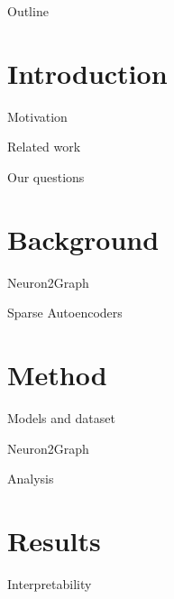 \documentclass[aspectratio=169,hyperref={pdfpagelabels=false}]{beamer}
\subtitle{\thesissubtitle}
\title{\thesistitle}
\begin{document}
\inserttitlepage


\begin{frame}{Outline} %
	\tableofcontents

\end{frame}

\section{Introduction} %
\begin{frame}{Motivation} %

\end{frame}

\begin{frame}{Related work} %

\end{frame}

\begin{frame}{Our questions} %

\end{frame}

\section{Background} %
\begin{frame}{Neuron2Graph} %

\end{frame}

\begin{frame}{Sparse Autoencoders} %
    
\end{frame}

\section{Method} %
\begin{frame}{Models and dataset} %
    
\end{frame}

\begin{frame}{Neuron2Graph} %
    
\end{frame}

\begin{frame}{Analysis} %
    
\end{frame}

\section{Results} %
\begin{frame}{Interpretability} %
    
\end{frame}
\end{document}
